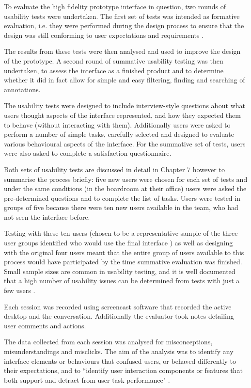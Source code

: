 To evaluate the high fidelity prototype interface in question, two rounds of usability tests were undertaken. The first set of tests was intended as formative evaluation, i.e. they were performed during the design process to ensure that the design was still conforming to user expectations and requirements \citep[p. 437]{RogersPreece}.

The results from these tests were then analysed and used to improve the design of the prototype. A second round of summative usability testing was then undertaken, to assess the interface as a finished product and to determine whether it did in fact allow for simple and easy filtering, finding and searching of annotations. 

The usability tests were designed to include interview-style questions about what users thought aspects of the interface represented, and how they expected them to behave (without interacting with them). Additionally users were asked to perform a number of simple tasks, carefully selected and designed to evaluate various behavioural aspects of the interface. For the summative set of tests, users were also asked to complete a satisfaction questionnaire. 

Both sets of usability tests are discussed in detail in Chapter 7 however to summarise the process briefly: five new users were chosen for each set of tests and under the same conditions (in the boardroom at their office) users were asked the pre-determined questions and to complete the list of tasks. Users were tested in groups of five because there were ten new users available in the team, who had not seen the interface before. 

Testing with these ten users (chosen to be a representative sample of the three user groups identified who would use the final interface \citep[p. 461]{RogersPreece}) as well as designing with the original four users meant that the entire group of users available to this process would have participated by the time summative evaluation was finished. Small sample sizes are common in usability testing, and it is well documented that a high number of usability issues can be determined from tests with just a few users \citep[p. 119]{HackosRedish}.

Each session was recorded using screencast software that recorded the active desktop and the conversation. Additionally the evaluator took notes detailing user comments and actions. 

The data collected from each session was analysed for misconceptions, misunderstandings and misclicks. The aim of the analysis was to identify any interface elements or behaviours that confused users, or behaved differently to their expectations, and to ``identify user interaction components or features that both support and detract from user task performance" \citep{GabbardHix}.

